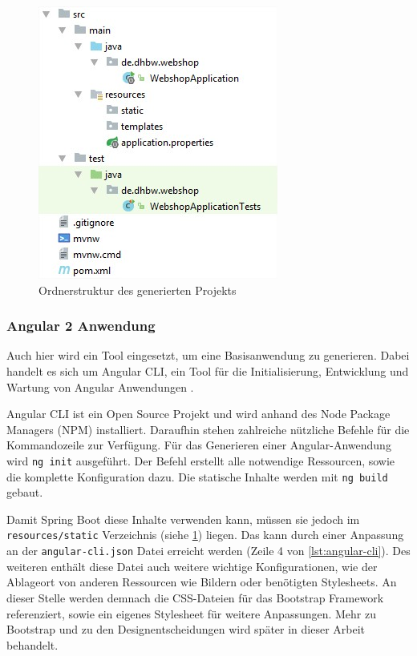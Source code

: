 \begin{figure}[th!]
	\centering
	\includegraphics[width=0.5\linewidth]{bilder/kap7/init-project}
	\caption{Ordnerstruktur des generierten Projekts}
	\label{fig:init-project}
\end{figure}

\subsubsection{Angular 2 Anwendung}\label{angular_setup}
Auch hier wird ein Tool eingesetzt, um eine Basisanwendung zu generieren. Dabei handelt es sich um Angular CLI, ein Tool für die Initialisierung, Entwicklung und Wartung von Angular Anwendungen \cite{Arora2017}.

Angular CLI ist ein Open Source Projekt und wird anhand des Node Package Managers (\acs{NPM}) installiert.
Daraufhin stehen zahlreiche nützliche Befehle für die Kommandozeile zur Verfügung.
Für das Generieren einer Angular-Anwendung wird \texttt{ng init} ausgeführt. Der Befehl erstellt alle notwendige Ressourcen, sowie die komplette Konfiguration dazu.
Die statische Inhalte werden mit \texttt{ng build} gebaut.

Damit Spring Boot diese Inhalte verwenden kann, müssen sie jedoch im  \texttt{resources/static} Verzeichnis (siehe \cref{fig:init-project}) liegen.
Das kann durch einer Anpassung an der \texttt{angular-cli.json} Datei erreicht werden (Zeile 4 von \cref{lst:angular-cli}).
Des weiteren enthält diese Datei auch weitere wichtige Konfigurationen, wie der Ablageort von anderen Ressourcen wie Bildern oder benötigten Stylesheets.
An dieser Stelle werden demnach die \acs{CSS}-Dateien für das Bootstrap Framework referenziert, sowie ein eigenes Stylesheet für weitere Anpassungen.
Mehr zu Bootstrap und zu den Designentscheidungen wird später in dieser Arbeit behandelt.
\\


